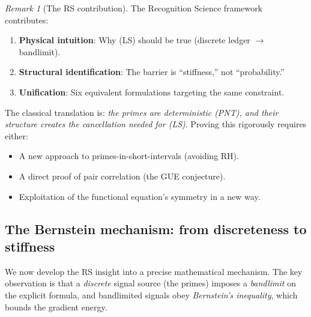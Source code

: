 \documentclass[11pt]{article}
\theoremstyle{definition}
\theoremstyle{remark}
\newtheorem{remark}[theorem]{Remark}
\theoremstyle{definition}
\begin{document}
\begin{remark}[The RS contribution]\label{rem:rs-contribution}
The Recognition Science framework contributes:
\begin{enumerate}
\item \textbf{Physical intuition}: Why \textup{(LS)} should be true (discrete ledger $\to$ bandlimit).
\item \textbf{Structural identification}: The barrier is ``stiffness,'' not ``probability.''
\item \textbf{Unification}: Six equivalent formulations targeting the same constraint.
\end{enumerate}

The classical translation is: \emph{the primes are deterministic (PNT), and their structure creates the cancellation needed for \textup{(LS)}}. Proving this rigorously requires either:
\begin{itemize}
\item A new approach to primes-in-short-intervals (avoiding RH).
\item A direct proof of pair correlation (the GUE conjecture).
\item Exploitation of the functional equation's symmetry in a new way.
\end{itemize}
\end{remark}

\subsection*{The Bernstein mechanism: from discreteness to stiffness}\label{sec:bernstein-mechanism}

We now develop the RS insight into a precise mathematical mechanism. The key observation is that a \emph{discrete} signal source (the primes) imposes a \emph{bandlimit} on the explicit formula, and bandlimited signals obey \emph{Bernstein's inequality}, which bounds the gradient energy.
\end{document}
